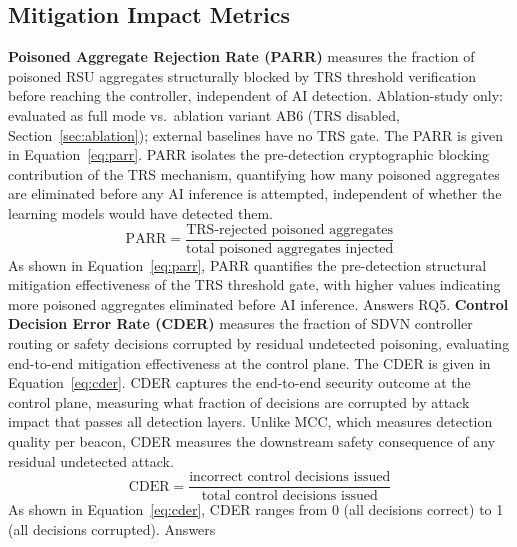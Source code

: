 \documentclass[12pt, a4paper]{report}
\begin{document}
\subsection{Mitigation Impact Metrics}

\textbf{Poisoned Aggregate Rejection Rate (PARR)} measures the
fraction of poisoned RSU aggregates structurally blocked by TRS
threshold verification before reaching the controller, independent
of AI detection. Ablation-study only: evaluated as full mode
vs.\ ablation variant AB6 (TRS disabled,
Section~\ref{sec:ablation}); external baselines have no
TRS gate. The PARR is given in Equation~\ref{eq:parr}.
\newline
\newline
PARR isolates the pre-detection cryptographic blocking contribution
of the TRS mechanism, quantifying how many poisoned aggregates are
eliminated before any AI inference is attempted, independent of
whether the learning models would have detected them.
\begin{equation}
  \mathrm{PARR} = \frac{\text{TRS-rejected poisoned aggregates}}
                       {\text{total poisoned aggregates injected}}
  \label{eq:parr}
\end{equation}
As shown in Equation~\ref{eq:parr}, PARR quantifies the
pre-detection structural mitigation effectiveness of the TRS
threshold gate, with higher values indicating more poisoned
aggregates eliminated before AI inference. Answers RQ5.
\newline
\newline
\textbf{Control Decision Error Rate (CDER)} measures the fraction
of SDVN controller routing or safety decisions corrupted by
residual undetected poisoning, evaluating end-to-end mitigation
effectiveness at the control plane. The CDER is given in
Equation~\ref{eq:cder}.
\newline
\newline
CDER captures the end-to-end security outcome at the control plane,
measuring what fraction of decisions are corrupted by attack impact
that passes all detection layers. Unlike MCC, which measures
detection quality per beacon, CDER measures the downstream safety
consequence of any residual undetected attack.
\begin{equation}
  \mathrm{CDER} = \frac{\text{incorrect control decisions issued}}
                       {\text{total control decisions issued}}
  \label{eq:cder}
\end{equation}
As shown in Equation~\ref{eq:cder}, CDER ranges from 0 (all
decisions correct) to 1 (all decisions corrupted). Answers
\end{document}
